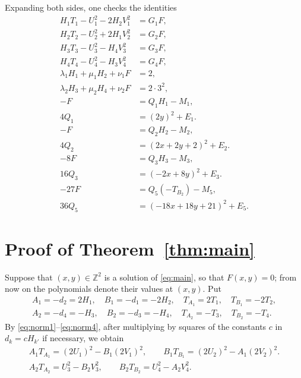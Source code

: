 \documentclass[11pt]{article}
\newcommand{\Z}{\mathbb{Z}}
\begin{document}
Expanding both sides, one checks the identities
\begin{align}
H_{1}T_{1}-U_{1}^2-2H_{2}V_{1}^2&=G_{1}F,\label{eq:norm1}\\
H_{2}T_{2}-U_{2}^2+2H_{1}V_{2}^2&=G_{2}F,\label{eq:norm2}\\
H_{3}T_{3}-U_{3}^2-H_{4}V_{3}^2&=G_{3}F,\label{eq:norm3}\\
H_{4}T_{4}-U_{4}^2-H_{3}V_{4}^2&=G_{4}F,\label{eq:norm4}\\
\lambda_{1}H_{1}+\mu_{1}H_{2}+\nu_{1}F&=2,\label{eq:cross1}\\
\lambda_{2}H_{3}+\mu_{2}H_{4}+\nu_{2}F&=2\cdot 3^{2},\label{eq:cross2}\\
-F&=Q_{1}H_{1}-M_{1},\label{eq:sign1}\\
4Q_{1}&=(2y)^2+E_{1}.\label{eq:sign1b}\\
-F&=Q_{2}H_{2}-M_{2},\label{eq:sign2}\\
4Q_{2}&=(2x+2y+2)^2+E_{2}.\label{eq:sign2b}\\
-8F&=Q_{3}H_{3}-M_{3},\label{eq:sign3}\\
16Q_{3}&=(-2x+8y)^2+E_{3}.\label{eq:sign3b}\\
-27F&=Q_{5}(-T_{B_{2}})-M_{5},\label{eq:sign5}\\
36Q_{5}&=(-18x+18y+21)^2+E_{5}.\label{eq:sign5b}
\end{align}

\section{Proof of Theorem~\ref{thm:main}}

Suppose that $(x,y)\in\Z^2$ is a solution of \eqref{eq:main}, so that $F(x,y)=0$; from now on the polynomials denote their values at $(x,y)$. Put
\begin{gather*}
A_{1}=-d_{2}=2H_{1},\quad B_{1}=-d_{1}=-2H_{2},\quad T_{A_{1}}=2T_{1},\quad T_{B_{1}}=-2T_{2},\\
A_{2}=-d_{4}=-H_{3},\quad B_{2}=-d_{3}=-H_{4},\quad T_{A_{2}}=-T_{3},\quad T_{B_{2}}=-T_{4}.
\end{gather*}
By \eqref{eq:norm1}--\eqref{eq:norm4}, after multiplying by squares of the constants $c$ in $d_k=cH_{k'}$ if necessary, we obtain
\begin{align}
A_{1}T_{A_{1}}=(2U_{1})^2-B_{1}(2V_{1})^2,\qquad B_{1}T_{B_{1}}=(2U_{2})^2-A_{1}(2V_{2})^2.\label{eq:AB1}\\
A_{2}T_{A_{2}}=U_{3}^2-B_{2}V_{3}^2,\qquad B_{2}T_{B_{2}}=U_{4}^2-A_{2}V_{4}^2.\label{eq:AB2}
\end{align}
\end{document}
